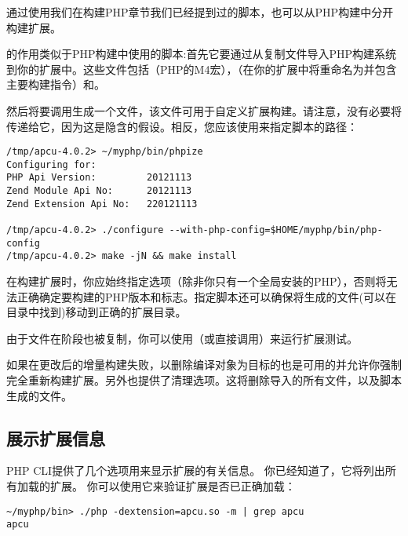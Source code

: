通过使用我们在构建PHP章节我们已经提到过的脚本，也可以从PHP构建中分开构建扩展。

的作用类似于PHP构建中使用的脚本:首先它要通过从复制文件导入PHP构建系统到你的扩展中。这些文件包括（PHP的M4宏），（在你的扩展中将重命名为并包含主要构建指令）和。

然后将要调用生成一个文件，该文件可用于自定义扩展构建。请注意，没有必要将传递给它，因为这是隐含的假设。相反，您应该使用来指定脚本的路径：

\begin{lstlisting}[language=shell]
/tmp/apcu-4.0.2> ~/myphp/bin/phpize
Configuring for:
PHP Api Version:         20121113
Zend Module Api No:      20121113
Zend Extension Api No:   220121113

/tmp/apcu-4.0.2> ./configure --with-php-config=$HOME/myphp/bin/php-config
/tmp/apcu-4.0.2> make -jN && make install
\end{lstlisting}

在构建扩展时，你应始终指定选项（除非你只有一个全局安装的PHP），否则将无法正确确定要构建的PHP版本和标志。指定脚本还可以确保将生成的文件(可以在目录中找到)移动到正确的扩展目录。

由于文件在阶段也被复制，你可以使用（或直接调用）来运行扩展测试。

如果在更改后的增量构建失败，以删除编译对象为目标的也是可用的并允许你强制完全重新构建扩展。另外也提供了清理选项。这将删除导入的所有文件，以及脚本生成的文件。

\subsection{展示扩展信息}

PHP CLI提供了几个选项用来显示扩展的有关信息。 你已经知道了，它将列出所有加载的扩展。 你可以使用它来验证扩展是否已正确加载：

\begin{lstlisting}[language=shell]
~/myphp/bin> ./php -dextension=apcu.so -m | grep apcu
apcu
\end{lstlisting}

